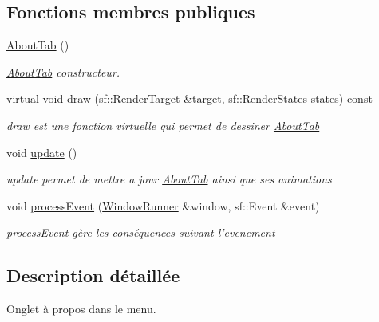 \subsection*{Fonctions membres publiques}
\begin{DoxyCompactItemize}
\item 
\hypertarget{class_about_tab_a29395079c83762b6de96329ebac84c40}{\hyperlink{class_about_tab_a29395079c83762b6de96329ebac84c40}{About\+Tab} ()}\label{class_about_tab_a29395079c83762b6de96329ebac84c40}

\begin{DoxyCompactList}\small\item\em \hyperlink{class_about_tab}{About\+Tab} constructeur. \end{DoxyCompactList}\item 
virtual void \hyperlink{class_about_tab_a7b3a3afc790414e0bd04cd51cd2a7d51}{draw} (sf\+::\+Render\+Target \&target, sf\+::\+Render\+States states) const 
\begin{DoxyCompactList}\small\item\em draw est une fonction virtuelle qui permet de dessiner \hyperlink{class_about_tab}{About\+Tab} \end{DoxyCompactList}\item 
\hypertarget{class_about_tab_a17d9523952b15687d73c52f4950dd2ab}{void \hyperlink{class_about_tab_a17d9523952b15687d73c52f4950dd2ab}{update} ()}\label{class_about_tab_a17d9523952b15687d73c52f4950dd2ab}

\begin{DoxyCompactList}\small\item\em update permet de mettre a jour \hyperlink{class_about_tab}{About\+Tab} ainsi que ses animations \end{DoxyCompactList}\item 
void \hyperlink{class_about_tab_a0159fc5280f161c1af6d1648f451bc3c}{process\+Event} (\hyperlink{class_window_runner}{Window\+Runner} \&window, sf\+::\+Event \&event)
\begin{DoxyCompactList}\small\item\em process\+Event gère les conséquences suivant l'evenement \end{DoxyCompactList}\end{DoxyCompactItemize}


\subsection{Description détaillée}
Onglet à propos dans le menu. 

